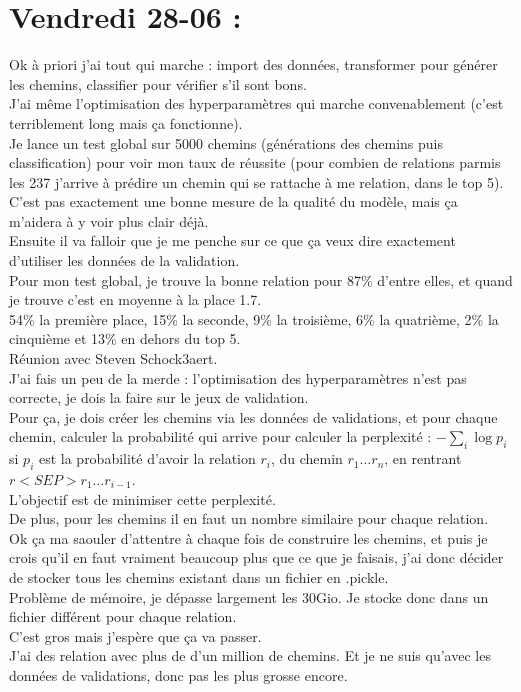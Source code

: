 \documentclass{article}
\begin{document}
\section*{Vendredi 28-06 :}
Ok à priori j'ai tout qui marche : import des données, transformer pour générer les chemins, classifier pour vérifier s'il sont bons.\\
J'ai même l'optimisation des hyperparamètres qui marche convenablement (c'est terriblement long mais ça fonctionne).\\
Je lance un test global sur 5000 chemins (générations des chemins puis classification) pour voir mon taux de réussite (pour combien de relations parmis les 237 j'arrive à prédire un chemin qui se rattache à me relation, dans le top 5).\\
C'est pas exactement une bonne mesure de la qualité du modèle, mais ça m'aidera à y voir plus clair déjà.\\
Ensuite il va falloir que je me penche sur ce que ça veux dire exactement d'utiliser les données de la validation.\\
Pour mon test global, je trouve la bonne relation pour 87\% d'entre elles, et quand je trouve c'est en moyenne à la place 1.7.\\
54\% la première place, 15\% la seconde, 9\% la troisième, 6\% la quatrième, 2\% la cinquième et 13\% en dehors du top 5.\\
Réunion avec Steven Schock3aert.\\
J'ai fais un peu de la merde : l'optimisation des hyperparamètres n'est pas correcte, je dois la faire sur le jeux de validation.\\
Pour ça, je dois créer les chemins via les données de validations, et pour chaque chemin, calculer la probabilité qui arrive pour calculer la perplexité : $-\sum_i\log p_i$ si $p_i$ est la probabilité d'avoir la relation $r_i$, du chemin $r_1\ldots r_n$, en rentrant $r <SEP> r_1 \ldots r_{i-1}$.\\
L'objectif est de minimiser cette perplexité.\\
De plus, pour les chemins il en faut un nombre similaire pour chaque relation.\\
Ok ça ma saouler d'attentre à chaque fois de construire les chemins, et puis je crois qu'il en faut vraiment beaucoup plus que ce que je faisais, j'ai donc décider de stocker tous les chemins existant dans un fichier en .pickle.\\
Problème de mémoire, je dépasse largement les 30Gio. Je stocke donc dans un fichier différent pour chaque relation.\\
C'est gros mais j'espère que ça va passer.\\
J'ai des relation avec plus de d'un million de chemins. Et je ne suis qu'avec les données de validations, donc pas les plus grosse encore.\\
\end{document}
